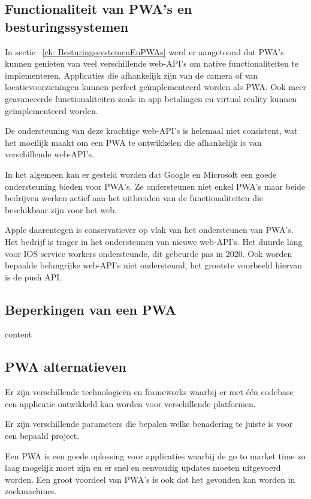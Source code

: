 	\subsection{Functionaliteit van PWA's en besturingssystemen}
	
		In sectie ~\ref{ch: BesturingssystemenEnPWAs} werd er aangetoond dat PWA's kunnen genieten van veel verschillende web-API's om native functionaliteiten te implementeren. Applicaties die afhankelijk zijn van de camera of van locatievoorzieningen kunnen perfect geïmplementeerd worden als PWA. Ook meer geavanceerde functionaliteiten zoals in app betalingen en virtual reality kunnen geïmplementeerd worden.
		
		De ondersteuning van deze krachtige web-API's is helemaal niet consistent, wat het moeilijk maakt om een PWA te ontwikkelen die afhankelijk is van verschillende web-API's. 
		
		In het algemeen kan er gesteld worden dat Google en Microsoft een goede ondersteuning bieden voor PWA's. Ze ondersteunen niet enkel PWA's maar beide bedrijven werken actief aan het uitbreiden van de functionaliteiten die beschikbaar zijn voor het web. 
		
		Apple daarentegen is conservatiever op vlak van het ondersteunen van PWA's. Het bedrijf is trager in het ondersteunen van nieuwe web-API's. 
		Het duurde lang voor IOS service workers ondersteunde, dit gebeurde pas in 2020. Ook worden bepaalde belangrijke web-API's niet ondersteund, het grootste voorbeeld hiervan is de push API.
					
	\subsection{Beperkingen van een PWA}
		content
	
	\subsection{PWA alternatieven}
		
		Er zijn verschillende technologieën en frameworks waarbij er met één codebase een applicatie ontwikkeld kan worden voor verschillende platformen. 
		
		Er zijn verschillende parameters die bepalen welke benadering te juiste is voor een bepaald project. 
	
		Een PWA is een goede oplossing voor applicaties waarbij de go to market time zo laag mogelijk moet zijn en er snel en eenvoudig updates moeten uitgevoerd worden. Een groot voordeel van PWA's is ook dat het gevonden kan worden in zoekmachines.
		

